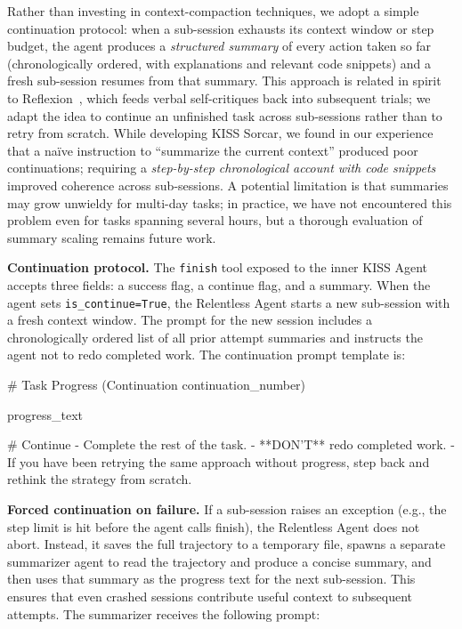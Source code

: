 \documentclass{article}
\begin{document}
Rather than investing in context-compaction techniques, we adopt a simple continuation protocol: when a sub-session exhausts its context window or step budget, the agent produces a \emph{structured summary} of every action taken so far (chronologically ordered, with explanations and relevant code snippets) and a fresh sub-session resumes from that summary.  This approach is related in spirit to Reflexion~\citep{shinn2023reflexion}, which feeds verbal self-critiques back into subsequent trials; we adapt the idea to continue an unfinished task across sub-sessions rather than to retry from scratch.  While developing KISS Sorcar, we found in our experience that a na\"ive instruction to ``summarize the current context'' produced poor continuations; requiring a \emph{step-by-step chronological account with code snippets} improved coherence across sub-sessions. A potential limitation is that summaries may grow unwieldy for multi-day tasks; in practice, we have not encountered this problem even for tasks spanning several hours, but a thorough evaluation of summary scaling remains future work.

\textbf{Continuation protocol.}  The \texttt{finish} tool exposed to the inner KISS Agent accepts three fields: a success flag, a continue flag, and a summary.  When the agent sets \texttt{is\_continue=True}, the Relentless Agent starts a new sub-session with a fresh context window.  The prompt for the new session includes a chronologically ordered list of all prior attempt summaries and instructs the agent not to redo completed work.  The continuation prompt template is:

\begin{prompt}
# Task Progress (Continuation {continuation_number})

{progress_text}

# Continue
- Complete the rest of the task.
- **DON'T** redo completed work.
- If you have been retrying the same approach without progress,
  step back and rethink the strategy from scratch.
\end{prompt}

\textbf{Forced continuation on failure.}  If a sub-session raises an exception (e.g., the step limit is hit before the agent calls finish), the Relentless Agent does not abort.  Instead, it saves the full trajectory to a temporary file, spawns a separate summarizer agent to read the trajectory and produce a concise summary, and then uses that summary as the progress text for the next sub-session.  This ensures that even crashed sessions contribute useful context to subsequent attempts.  The summarizer receives the following prompt:
\end{document}
